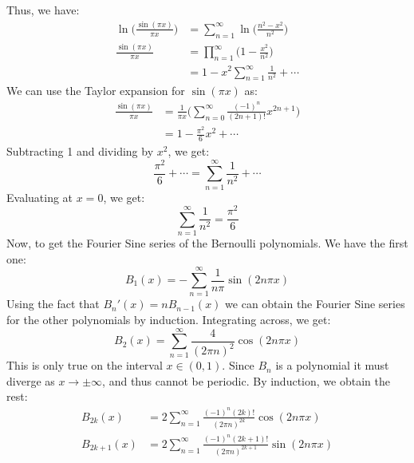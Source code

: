\documentclass[crop=false,class=book,oneside]{standalone}
\begin{document}
            Thus, we have:
            \begin{align}
                \ln\Big(\frac{\sin(\pi{x})}{\pi{x}}\Big)
                &=\sum_{n=1}^{\infty}
                    \ln\Big(\frac{n^{2}-x^{2}}{n^{2}}\Big)\\
                \frac{\sin(\pi{x})}{\pi{x}}
                &=\prod_{n=1}^{\infty}\Big(1-\frac{x^{2}}{n^{2}}\Big)\\
                &=1-x^{2}\sum_{n=1}^{\infty}\frac{1}{n^{2}}+\cdots
            \end{align}
            We can use the Taylor expansion for $\sin(\pi{x})$ as:
            \begin{align}
                \frac{\sin(\pi{x})}{\pi{x}}&=
                \frac{1}{\pi{x}}\Big(\sum_{n=0}^{\infty}
                    \frac{(-1)^{n}}{(2n+1)!}x^{2n+1}\Big)\\
                &=1-\frac{\pi^{2}}{6}x^{2}+\cdots
            \end{align}
            Subtracting 1 and dividing by $x^{2}$, we get:
            \begin{equation}
                \frac{\pi^{2}}{6}+\cdots
                =\sum_{n=1}^{\infty}\frac{1}{n^{2}}+\cdots
            \end{equation}
            Evaluating at $x=0$, we get:
            \begin{equation}
                \sum_{n=1}^{\infty}\frac{1}{n^{2}}=\frac{\pi^{2}}{6}
            \end{equation}
            Now, to get the Fourier Sine series of the Bernoulli polynomials.
            We have the first one:
            \begin{equation}
                B_{1}(x)=\minus\sum_{n=1}^{\infty}\frac{1}{n\pi}\sin(2n\pi{x})
            \end{equation}
            Using the fact that $B_{n}'(x)=nB_{n-1}(x)$ we can obtain the
            Fourier Sine series for the other polynomials by induction.
            Integrating across, we get:
            \begin{equation}
                B_{2}(x)=\sum_{n=1}^{\infty}\frac{4}{(2\pi{n})^{2}}
                    \cos(2n\pi{x})
            \end{equation}
            This is only true on the interval $x\in(0,1)$. Since 
            $B_{n}$ is a polynomial it must diverge as
            $x\rightarrow\pm\infty$, and thus cannot be periodic. By
            induction, we obtain the rest:
            \begin{align}
                B_{2k}(x)&=
                    2\sum_{n=1}^{\infty}
                        \frac{(-1)^{n}(2k)!}{(2\pi{n})^{2k}}\cos(2n\pi{x})\\
                B_{2k+1}(x)&=
                    2\sum_{n=1}^{\infty}
                        \frac{(-1)^{n}(2k+1)!}{(2\pi{n})^{2k+1}}
                            \sin(2n\pi{x})\\
            \end{align}
\end{document}
